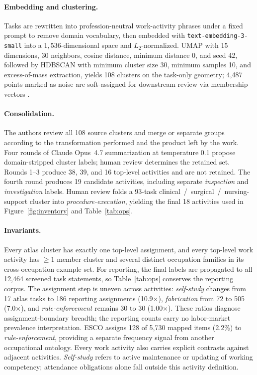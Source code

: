 \documentclass[10pt]{article}
\begin{document}
\paragraph{Embedding and clustering.}
Tasks are rewritten into profession-neutral work-activity phrases under a fixed prompt to remove domain vocabulary, then embedded with \texttt{text-embedding-3-small} into a $1{,}536$-dimensional space and $L_{2}$-normalized.
UMAP with 15 dimensions, 30 neighbors, cosine distance, minimum distance 0, and seed 42, followed by HDBSCAN with minimum cluster size 30, minimum samples 10, and excess-of-mass extraction, yields 108 clusters on the task-only geometry; 4{,}487 points marked as noise are soft-assigned for downstream review via membership vectors \citep{mcinnes2018umap,campello2013density}.

\paragraph{Consolidation.}
The authors review all 108 source clusters and merge or separate groups according to the transformation performed and the product left by the work. Four rounds of Claude Opus~4.7 summarization at temperature 0.1 propose domain-stripped cluster labels; human review determines the retained set. Rounds 1--3 produce 38, 39, and 16 top-level activities and are not retained. The fourth round produces 19 candidate activities, including separate \emph{inspection} and \emph{investigation} labels. Human review folds a 93-task clinical~/~surgical~/~nursing-support cluster into \emph{procedure-execution}, yielding the final 18 activities used in Figure~\ref{fig:inventory} and Table~\ref{tab:ops}.

\paragraph{Invariants.}
Every atlas cluster has exactly one top-level assignment, and every top-level work activity has $\geq\!1$ member cluster and several distinct occupation families in its cross-occupation example set. For reporting, the final labels are propagated to all 12{,}464 screened task statements, so Table~\ref{tab:ops} conserves the reporting corpus. The assignment step is uneven across activities: \emph{self-study} changes from 17 atlas tasks to 186 reporting assignments (10.9$\times$), \emph{fabrication} from 72 to 505 (7.0$\times$), and \emph{rule-enforcement} remains 30 to 30 (1.00$\times$). These ratios diagnose assignment-boundary breadth; the reporting counts carry no labor-market prevalence interpretation. ESCO assigns 128 of 5{,}730 mapped items (2.2\%) to \emph{rule-enforcement}, providing a separate frequency signal from another occupational ontology. Every work activity also carries explicit contrasts against adjacent activities. \emph{Self-study} refers to active maintenance or updating of working competency; attendance obligations alone fall outside this activity definition.
\end{document}
